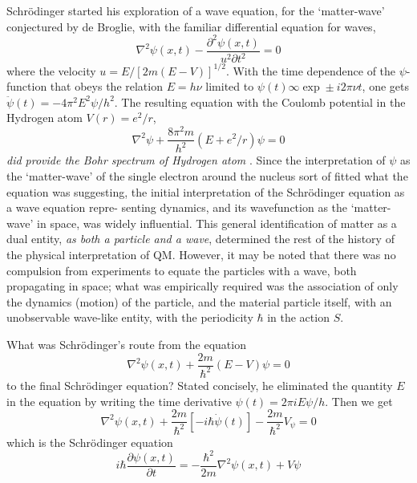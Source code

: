 Schr\"{o}dinger started his exploration of a wave equation, for the `matter-wave' conjectured
by de Broglie, with the familiar differential equation for waves,
\begin{equation*}
\nabla^2 \psi (x,t) - \frac{\partial^2 \psi (x,t)}{u^2 \partial t^2} = 0 \tag{2}
\end{equation*}
where the velocity $u = E/ [2m(E - V )]^{1/2}$. With the time dependence of the $\psi$-function
that obeys the relation $E = h\nu$ limited to $\psi(t) \infty \exp \pm i2\pi \nu t$, one gets $\ddot{\psi} (t) = -4 \pi^2 E^2 \psi /h^2$.
The resulting equation with the Coulomb potential in the Hydrogen atom $V (r) = e^2 /r$,
\begin{equation*}
\nabla^2 \psi + \frac{8 \pi^2 m}{h^2} (E + e^2 / r) \psi = 0 \tag{3}
\end{equation*}
\textit{did provide the Bohr spectrum of Hydrogen atom} \cite{chap27-key1}. Since the interpretation of $\psi$ as the
`matter-wave' of the single electron around the nucleus sort of fitted what the equation was
suggesting, the initial interpretation of the Schr\"{o}dinger equation as a wave equation repre-
senting dynamics, and its wavefunction as the `matter-wave' in space, was widely influential.
This general identification of matter as a dual entity, \textit{as both a particle and a wave}, determined the rest of the history of the physical interpretation of QM. However, it may be noted that there was no compulsion from experiments to equate the particles with a wave,
both propagating in space; what was empirically required was the association of only the
dynamics (motion) of the particle, and the material particle itself, with an unobservable
wave-like entity, with the periodicity $\hbar$ in the action $S$.

What was Schr\"{o}dinger's route from the equation
\begin{equation*}
\nabla^2 \psi(x,t) + \frac{2m}{\hbar^2} (E-V) \psi = 0 \tag{4}
\end{equation*}
to the final Schr\"{o}dinger equation? Stated concisely, he eliminated the quantity $E$ in the
equation by writing the time derivative $\psi(t) = 2\pi i E \psi /h$. Then we get
\begin{equation*}
\nabla^2 \psi (x,t)  + \frac{2m}{\hbar^2} [-i \hbar \dot{\psi} (t)] - \frac{2m}{\hbar^2} V_{\psi} = 0 \tag{5}
\end{equation*}
which is the Schr\"{o}dinger equation
\begin{equation*}
i \hbar \frac{\partial \psi (x,t)}{\partial t} = - \frac{\hbar^2}{2m} \nabla^2 \psi (x,t) + V \psi  \tag{6}
\end{equation*}

